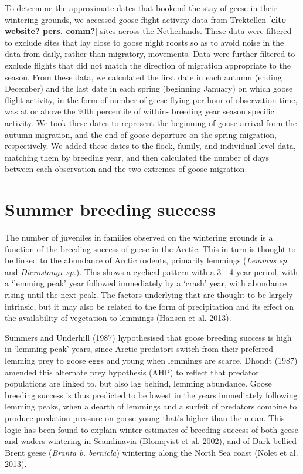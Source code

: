 \documentclass[twocolumn]{article}
\begin{document}
To determine the approximate dates that bookend the stay of geese in
their wintering grounds, we accessed goose flight activity data from
Trektellen {[}\textbf{cite website? pers. comm?}{]} sites across the
Netherlands. These data were filtered to exclude sites that lay close to
goose night roosts so as to avoid noise in the data from daily, rather
than migratory, movements. Data were further filtered to exclude flights
that did not match the direction of migration appropriate to the season.
From these data, we calculated the first date in each autumn (ending
December) and the last date in each spring (beginning January) on which
goose flight activity, in the form of number of geese flying per hour of
observation time, was at or above the 90th percentile of within-
breeding year season specific activity. We took these dates to represent
the beginning of goose arrival from the autumn migration, and the end of
goose departure on the spring migration, respectively. We added these
dates to the flock, family, and individual level data, matching them by
breeding year, and then calculated the number of days between each
observation and the two extremes of goose migration.

\section{Summer breeding success}\label{summer-breeding-success}

The number of juveniles in families observed on the wintering grounds is
a function of the breeding success of geese in the Arctic. This in turn
is thought to be linked to the abundance of Arctic rodents, primarily
lemmings (\emph{Lemmus sp.} and \emph{Dicrostonyx sp.}). This shows a
cyclical pattern with a 3 - 4 year period, with a `lemming peak' year
followed immediately by a `crash' year, with abundance rising until the
next peak. The factors underlying that are thought to be largely
intrinsic, but it may also be related to the form of precipitation and
its effect on the availability of vegetation to lemmings (Hansen et al.
2013).

Summers and Underhill (1987) hypothesised that goose breeding success is
high in `lemming peak' years, since Arctic predators switch from their
preferred lemming prey to goose eggs and young when lemmings are scarce.
Dhondt (1987) amended this alternate prey hypothesis (AHP) to reflect
that predator populations are linked to, but also lag behind, lemming
abundance. Goose breeding success is thus predicted to be lowest in the
years immediately following lemming peaks, when a dearth of lemmings and
a surfeit of predators combine to produce predation pressure on goose
young that's higher than the mean. This logic has been found to explain
winter estimates of breeding success of both geese and waders wintering
in Scandinavia (Blomqvist et al. 2002), and of Dark-bellied Brent geese
(\emph{Branta b. bernicla}) wintering along the North Sea coast (Nolet
et al. 2013).
\end{document}
